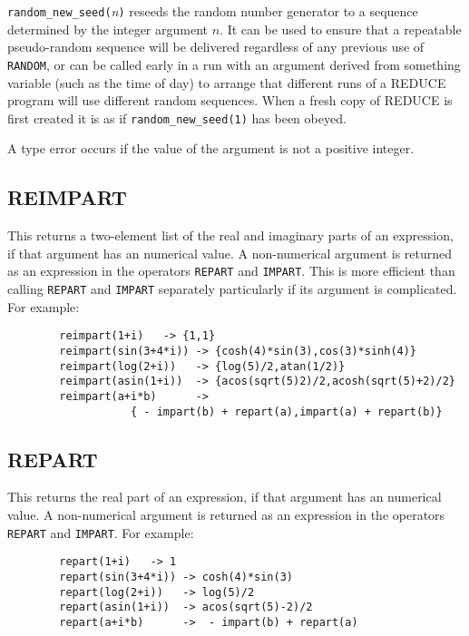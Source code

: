 \texttt{random\_new\_seed(}\emph{n}\texttt{)} reseeds the random number
generator
to a sequence determined by the integer argument $n$.  It can be used to
ensure that a repeatable pseudo-random sequence will be delivered
regardless of any previous use of \texttt{RANDOM}, or can be called early in
a run with an argument derived from something variable (such as the time
of day) to arrange that different runs of a REDUCE program will use
different random sequences.  When a fresh copy of REDUCE is first created
it is as if \texttt{random\_new\_seed(1)} has been obeyed.

A type error occurs if the value of the argument is not a positive integer.

\subsection{REIMPART}
\hypertarget{operator:REIMPART}{}
This returns a two-element list of the real and imaginary parts of an
expression, if that argument has an
numerical value.  A non-numerical argument is returned as an expression in
the operators \texttt{REPART} and \texttt{IMPART}.
This is more efficient than calling \texttt{REPART} and \texttt{IMPART}
separately particularly if its argument is complicated.
For example:
\begin{verbatim}
        reimpart(1+i)   -> {1,1}
        reimpart(sin(3+4*i)) -> {cosh(4)*sin(3),cos(3)*sinh(4)}
        reimpart(log(2+i))   -> {log(5)/2,atan(1/2)}
        reimpart(asin(1+i))  -> {acos(sqrt(5)2)/2,acosh(sqrt(5)+2)/2}
        reimpart(a+i*b)      -> 
                   { - impart(b) + repart(a),impart(a) + repart(b)}
\end{verbatim}

\subsection{REPART}
\hypertarget{operator:REPART}{}
This returns the real part of an expression, if that argument has an
numerical value.  A non-numerical argument is returned as an expression in
the operators \texttt{REPART} and \texttt{IMPART}.  
For example:
\begin{verbatim}
        repart(1+i)   -> 1
        repart(sin(3+4*i)) -> cosh(4)*sin(3)
        repart(log(2+i))   -> log(5)/2
        repart(asin(1+i))  -> acos(sqrt(5)-2)/2         
        repart(a+i*b)      ->  - impart(b) + repart(a)
\end{verbatim}

